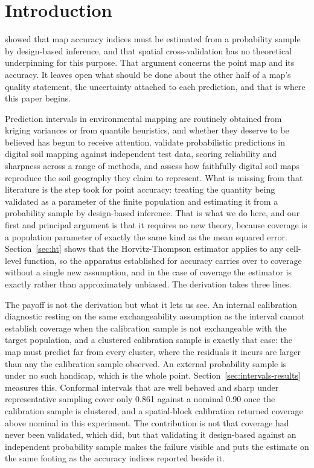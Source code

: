 \documentclass[preprint,12pt,authoryear]{elsarticle}
\begin{document}
\section{Introduction}

\citet{wadoux2021} showed that map accuracy indices must be estimated from a
probability sample by design-based inference, and that spatial cross-validation
has no theoretical underpinning for this purpose. That argument concerns the
point map and its accuracy. It leaves open what should be done about the other
half of a map's quality statement, the uncertainty attached to each prediction,
and that is where this paper begins.

Prediction intervals in environmental mapping are routinely obtained from
kriging variances or from quantile heuristics, and whether they deserve to be
believed has begun to receive attention. \citet{schmidinger2023} validate
probabilistic predictions in digital soil mapping against independent test data,
scoring reliability and sharpness across a range of methods, and
\citet{rossiter2022} assess how faithfully digital soil maps reproduce the soil
geography they claim to represent. What is missing from that literature is the
step \citet{wadoux2021} took for point accuracy: treating the quantity being
validated as a parameter of the finite population and estimating it from a
probability sample by design-based inference. That is what we do here, and our
first and principal argument is that it requires no new theory, because coverage
is a population parameter of exactly the same kind as the mean squared error. Section~\ref{sec:ht} shows
that the Horvitz-Thompson estimator applies to any cell-level function, so the
apparatus \citet{wadoux2021} established for accuracy carries over to coverage
without a single new assumption, and in the case of coverage the estimator is
exactly rather than approximately unbiased. The derivation takes three lines.

The payoff is not the derivation but what it lets us see. An internal
calibration diagnostic resting on the same exchangeability assumption as the
interval cannot establish coverage when the calibration sample is not
exchangeable with the target population, and a clustered calibration sample is
exactly that case: the map must predict far from every cluster, where the
residuals it incurs are larger than any the calibration sample observed. An
external probability sample is under no such handicap, which is the whole point. Section~\ref{sec:intervals-results} measures this. Conformal intervals
that are well behaved and sharp under representative sampling cover only 0.861
against a nominal 0.90 once the calibration sample is clustered, and a
spatial-block calibration returned coverage above nominal in this experiment. The
contribution is not that coverage had never been validated, which
\citet{schmidinger2023} did, but that validating it design-based against an
independent probability sample makes the failure visible and puts the estimate
on the same footing as the accuracy indices reported beside it.
\end{document}
